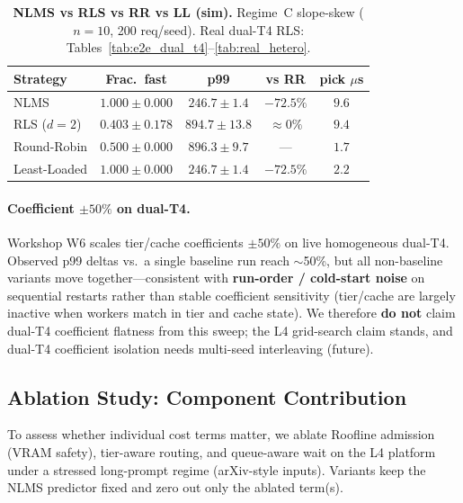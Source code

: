 \documentclass[10pt,twocolumn,letterpaper]{article}
\begin{document}
\begin{table}[t]
\centering
\scriptsize
\setlength{\tabcolsep}{2.5pt}
\begin{tabular}{@{}lcccc@{}}
\toprule
\textbf{Strategy} & \textbf{Frac.\ fast} & \textbf{p99} & \textbf{vs RR} & \textbf{pick $\mu$s} \\
\midrule
NLMS & $1.000\pm0.000$ & $246.7\pm1.4$ & $-72.5\%$ & $9.6$ \\
RLS ($d{=}2$) & $0.403\pm0.178$ & $894.7\pm13.8$ & $\approx 0\%$ & $9.4$ \\
Round-Robin & $0.500\pm0.000$ & $896.3\pm9.7$ & --- & $1.7$ \\
Least-Loaded & $1.000\pm0.000$ & $246.7\pm1.4$ & $-72.5\%$ & $2.2$ \\
\bottomrule
\end{tabular}
\caption{\textbf{NLMS vs RLS vs RR vs LL (sim).} Regime~C slope-skew ($n{=}10$, 200 req/seed). Real dual-T4 RLS: Tables~\ref{tab:e2e_dual_t4}--\ref{tab:real_hetero}.}
\label{tab:rls_h2h}
\end{table}

\paragraph{Coefficient $\pm50\%$ on dual-T4.}
Workshop W6 scales tier/cache coefficients $\pm50\%$ on live homogeneous dual-T4. Observed p99 deltas vs.\ a single baseline run reach $\sim$50\%, but all non-baseline variants move together---consistent with \textbf{run-order / cold-start noise} on sequential restarts rather than stable coefficient sensitivity (tier/cache are largely inactive when workers match in tier and cache state). We therefore \textbf{do not} claim dual-T4 coefficient flatness from this sweep; the L4 grid-search claim stands, and dual-T4 coefficient isolation needs multi-seed interleaving (future).

\subsection{Ablation Study: Component Contribution}
To assess whether individual cost terms matter, we ablate Roofline admission (VRAM safety), tier-aware routing, and queue-aware wait on the L4 platform under a stressed long-prompt regime (arXiv-style inputs). Variants keep the NLMS predictor fixed and zero out only the ablated term(s).
\end{document}
